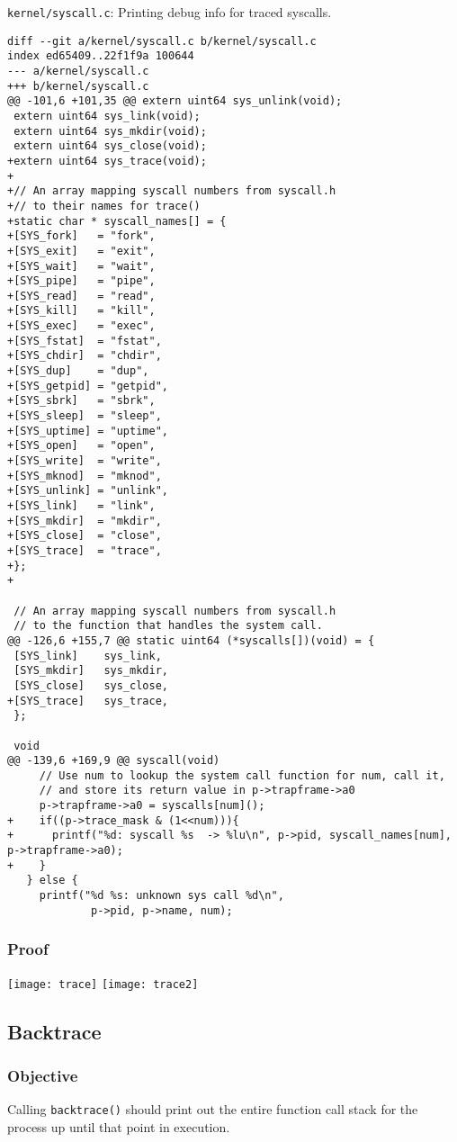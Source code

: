 \documentclass{article}
\begin{document}
\texttt{kernel/syscall.c}: Printing debug info for traced syscalls.
\begin{verbatim}
diff --git a/kernel/syscall.c b/kernel/syscall.c
index ed65409..22f1f9a 100644
--- a/kernel/syscall.c
+++ b/kernel/syscall.c
@@ -101,6 +101,35 @@ extern uint64 sys_unlink(void);
 extern uint64 sys_link(void);
 extern uint64 sys_mkdir(void);
 extern uint64 sys_close(void);
+extern uint64 sys_trace(void);
+
+// An array mapping syscall numbers from syscall.h
+// to their names for trace() 
+static char * syscall_names[] = {
+[SYS_fork]   = "fork",
+[SYS_exit]   = "exit",
+[SYS_wait]   = "wait",
+[SYS_pipe]   = "pipe",
+[SYS_read]   = "read",
+[SYS_kill]   = "kill",
+[SYS_exec]   = "exec",
+[SYS_fstat]  = "fstat",
+[SYS_chdir]  = "chdir",
+[SYS_dup]    = "dup",
+[SYS_getpid] = "getpid",
+[SYS_sbrk]   = "sbrk",
+[SYS_sleep]  = "sleep",
+[SYS_uptime] = "uptime",
+[SYS_open]   = "open",
+[SYS_write]  = "write",
+[SYS_mknod]  = "mknod",
+[SYS_unlink] = "unlink",
+[SYS_link]   = "link",
+[SYS_mkdir]  = "mkdir",
+[SYS_close]  = "close",
+[SYS_trace]  = "trace",
+};
+
 
 // An array mapping syscall numbers from syscall.h
 // to the function that handles the system call.
@@ -126,6 +155,7 @@ static uint64 (*syscalls[])(void) = {
 [SYS_link]    sys_link,
 [SYS_mkdir]   sys_mkdir,
 [SYS_close]   sys_close,
+[SYS_trace]   sys_trace,
 };
 
 void
@@ -139,6 +169,9 @@ syscall(void)
     // Use num to lookup the system call function for num, call it,
     // and store its return value in p->trapframe->a0
     p->trapframe->a0 = syscalls[num]();
+    if((p->trace_mask & (1<<num))){
+      printf("%d: syscall %s  -> %lu\n", p->pid, syscall_names[num], p->trapframe->a0);
+    }
   } else {
     printf("%d %s: unknown sys call %d\n",
             p->pid, p->name, num);
\end{verbatim}

\subsubsection*{Proof}
\texttt{[image: trace]}
\newpage
\texttt{[image: trace2]}

\subsection{Backtrace}
\subsubsection*{Objective}
Calling \texttt{backtrace()} should print out the entire function call stack for the process up until that point in execution.
\end{document}
